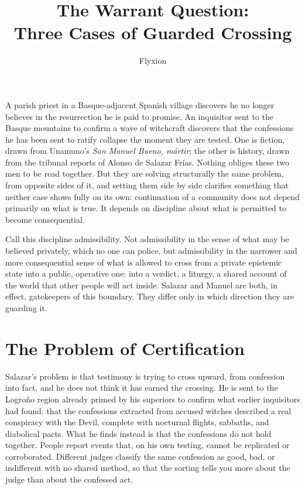 \documentclass[12pt]{article}
\title{The Warrant Question:\\Three Cases of Guarded Crossing}
\author{Flyxion}
\date{}
\begin{document}
\maketitle

\section*{}

A parish priest in a Basque-adjacent Spanish village discovers he no longer believes in the resurrection he is paid to promise. An inquisitor sent to the Basque mountains to confirm a wave of witchcraft discovers that the confessions he has been sent to ratify collapse the moment they are tested. One is fiction, drawn from Unamuno's \textit{San Manuel Bueno, m\'artir}; the other is history, drawn from the tribunal reports of Alonso de Salazar Fr\'ias. Nothing obliges these two men to be read together. But they are solving structurally the same problem, from opposite sides of it, and setting them side by side clarifies something that neither case shows fully on its own: continuation of a community does not depend primarily on what is true. It depends on discipline about what is permitted to become consequential.

Call this discipline admissibility. Not admissibility in the sense of what may be believed privately, which no one can police, but admissibility in the narrower and more consequential sense of what is allowed to cross from a private epistemic state into a public, operative one: into a verdict, a liturgy, a shared account of the world that other people will act inside. Salazar and Manuel are both, in effect, gatekeepers of this boundary. They differ only in which direction they are guarding it.

\section*{The Problem of Certification}

Salazar's problem is that testimony is trying to cross upward, from confession into fact, and he does not think it has earned the crossing. He is sent to the Logro\~no region already primed by his superiors to confirm what earlier inquisitors had found: that the confessions extracted from accused witches described a real conspiracy with the Devil, complete with nocturnal flights, sabbaths, and diabolical pacts.\cite{salazar1612} What he finds instead is that the confessions do not hold together. People report events that, on his own testing, cannot be replicated or corroborated. Different judges classify the same confession as good, bad, or indifferent with no shared method, so that the sorting tells you more about the judge than about the confessed act. 
\end{document}
